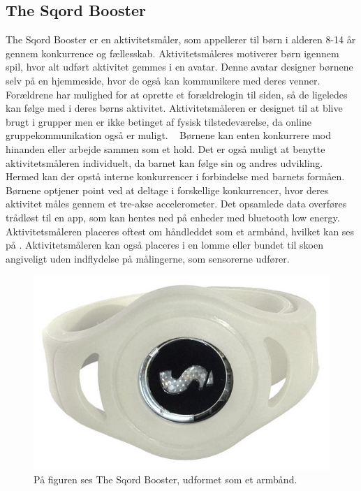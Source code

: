 \subsection{The Sqord Booster}
The Sqord Booster er en aktivitetsmåler, som appellerer til børn i alderen 8-14 år gennem konkurrence og fællesskab. Aktivitetsmåleres motiverer børn igennem spil, hvor alt udført aktivitet gemmes i en avatar. Denne avatar designer børnene selv på en hjemmeside, hvor de også kan kommunikere med deres venner. Forældrene har mulighed for at oprette et forældrelogin til siden, så de ligeledes kan følge med i deres børns aktivitet. Aktivitetsmåleren er designet til at blive brugt i grupper men er ikke betinget af fysisk tilstedeværelse, da online gruppekommunikation også er muligt.%
~\citep{Sqord_family2015} Børnene kan enten konkurrere mod hinanden eller arbejde sammen som et hold. Det er også muligt at benytte aktivitetsmåleren individuelt, da barnet kan følge sin og andres udvikling. Hermed kan der opstå interne konkurrencer i forbindelse med barnets formåen. \citep{Sqord_family2015,Sqord_group2015} \\
Børnene optjener point ved at deltage i forskellige konkurrencer, hvor deres aktivitet måles gennem et tre-akse accelerometer. Det opsamlede data overføres trådløst til en app, som kan hentes ned på enheder med bluetooth low energy. Aktivitetsmåleren placeres oftest om håndleddet som et armbånd, hvilket kan ses på . Aktivitetsmåleren kan også placeres i en lomme eller bundet til skoen angiveligt uden indflydelse på målingerne, som sensorerne udfører. \citep{Sqord_family2015}
\begin{figure}[H]
	\centering
	\includegraphics[scale=0.31]{figures/aProblemanalyse/sqord.JPG}
	\caption{På figuren ses The Sqord Booster, udformet som et armbånd. \citep{Sqord2016}}
	\label{fig:sqord}
\end{figure}
